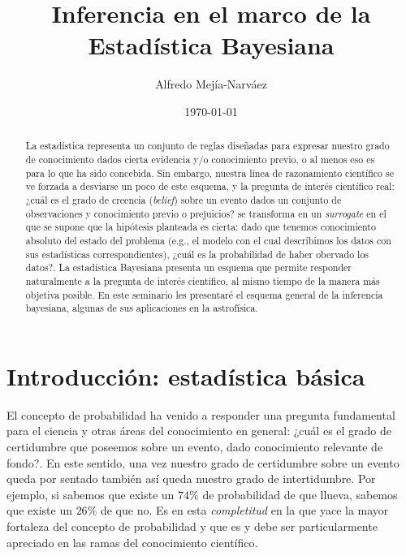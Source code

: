 \documentclass[a4paper,twoside]{article}
\title{Inferencia en el marco de la Estadística Bayesiana}
\author{Alfredo Mejía-Narváez}
\date{\today}
\begin{document}
\maketitle

\begin{abstract}
%
La estadística representa un conjunto de reglas diseñadas para expresar nuestro grado de
conocimiento dados cierta evidencia y/o conocimiento previo, o al menos eso es para lo que ha sido
concebida. Sin embargo, nuestra línea de razonamiento científico se ve forzada a desviarse un poco
de este esquema, y la pregunta de interés científico real: ¿cuál es el grado de creencia
(\emph{belief}) sobre un evento dados un conjunto de observaciones y conocimiento previo o
prejuicios? se transforma en un \emph{surrogate} en el que se supone que la hipótesis planteada es
cierta: dado que tenemos conocimiento absoluto del estado del problema (e.g., el modelo con el cual
describimos los datos con sus estadísticas correspondientes), ¿cuál es la probabilidad de haber
obervado los datos?. La estadística Bayesiana presenta un esquema que permite responder naturalmente
a la pregunta de interés científico, al mismo tiempo de la manera más objetiva posible. En este
seminario les presentaré el esquema general de la inferencia bayesiana, algunas de sus aplicaciones
en la astrofísica.
%
\end{abstract}


\section{Introducción: estadística básica}

El concepto de probabilidad ha venido a responder una pregunta fundamental para el ciencia y otras
áreas del conocimiento en general: ¿cuál es el grado de certidumbre que poseemos sobre un evento,
dado conocimiento relevante de fondo?. En este sentido, una vez nuestro grado de certidumbre sobre
un evento queda por sentado también así queda nuestro grado de intertidumbre. Por ejemplo, si
sabemos que existe un \(74\%\) de probabilidad de que llueva, sabemos que existe un \(26\%\) de que
no. Es en esta \emph{completitud} en la que yace la mayor fortaleza del concepto de probabilidad y
que es y debe ser particularmente apreciado en las ramas del conocimiento científico.
\end{document}

